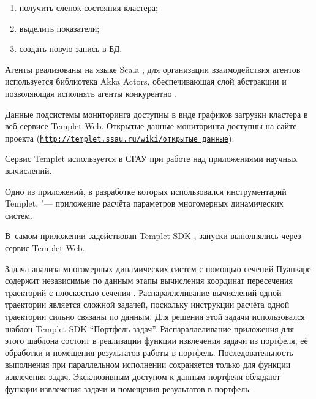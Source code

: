 \begin{enumerate}

\item получить слепок состояния кластера;

\item выделить показатели;

\item создать новую запись в БД.

\end{enumerate}



Агенты реализованы на языке Scala \cite{Haller2009Scala}, для организации взаимодействия агентов используется библиотека Akka Actors, обеспечивающая слой абстракции и позволяющая исполнять агенты конкурентно \cite{Shams2012Actors}.



Данные подсистемы мониторинга доступны в виде графиков загрузки кластера в веб-сервисе Templet Web. Открытые данные мониторинга доступны на сайте проекта (\href{http://templet.ssau.ru/wiki/%D0%BE%D1%82%D0%BA%D1%80%D1%8B%D1%82%D1%8B%D0%B5_%D0%B4%D0%B0%D0%BD%D0%BD%D1%8B%D0%B5}{\tt http://templet.ssau.ru/wiki/открытые\_дан\-ные}).



\smallskip




Сервис Templet \cite{ArtamVostNazar2012IntegrationService} используется в СГАУ при работе над приложениями научных вычислений. 

Одно из приложений, в разработке которых использовался инструментарий Templet, "--- приложение расчёта параметров многомерных динамических систем. 

В~самом приложении задействован Templet SDK \cite{Vostokin2014Samstu}, запуски выполнялись через сервис Templet Web.



Задача анализа многомерных динамических систем с помощью сечений Пуанкаре содержит независимые по данным этапы вычисления координат пересечения траекторий с плоскостью сечения \cite{VostDorArtam2014GPT}. Распараллеливание вычислений одной траектории является сложной задачей, поскольку инструкции расчёта одной траектории сильно связаны по данным. Для решения этой задачи использовался шаблон Templet SDK ``Портфель задач''. Распараллеливание приложения для этого шаблона состоит в реализации функции извлечения задачи из портфеля, её обработки и помещения результатов работы в портфель. Последовательность выполнения при параллельном исполнении сохраняется только для функции извлечения задач. Эксклюзивным доступом к данным портфеля обладают функции извлечения задачи и помещения результатов в портфель.



